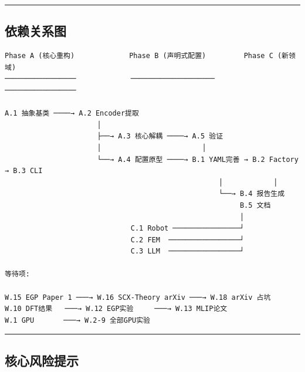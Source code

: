 \documentclass[
  12pt,
]{ctexart}
\begin{document}
\begin{center}\rule{0.5\linewidth}{0.5pt}\end{center}

\subsection{依赖关系图}\label{ux4f9dux8d56ux5173ux7cfbux56fe}

\begin{verbatim}
Phase A (核心重构)             Phase B (声明式配置)         Phase C (新领域)
─────────────────             ────────────────────        ─────────────────

A.1 抽象基类 ────→ A.2 Encoder提取
                      │
                      ├──→ A.3 核心解耦 ────→ A.5 验证
                      │                        │
                      └──→ A.4 配置原型 ────→ B.1 YAML完善 → B.2 Factory → B.3 CLI
                                                   │            │
                                                   └──→ B.4 报告生成
                                                        B.5 文档
                                                        │
                              C.1 Robot ────────────────┘
                              C.2 FEM  ─────────────────┘
                              C.3 LLM  ─────────────────┘

等待项:

W.15 EGP Paper 1 ───→ W.16 SCX-Theory arXiv ───→ W.18 arXiv 占坑
W.10 DFT结果   ───→ W.12 EGP实验     ───→ W.13 MLIP论文
W.1 GPU       ───→ W.2-9 全部GPU实验
\end{verbatim}

\begin{center}\rule{0.5\linewidth}{0.5pt}\end{center}

\subsection{核心风险提示}\label{ux6838ux5fc3ux98ceux9669ux63d0ux793a}
\end{document}
